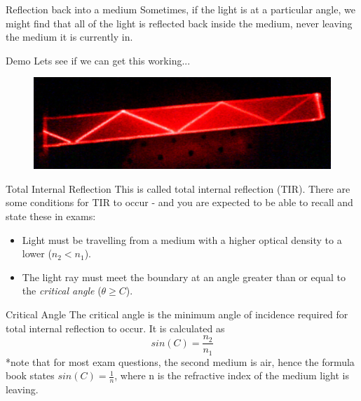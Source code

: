 \documentclass[../Main.tex]{subfiles}
\begin{document}
\begin{frame}{Reflection back into a medium}
    Sometimes, if the light is at a particular angle, we might find that all of the light is reflected back inside the medium, never leaving the medium it is currently in. \pause
    \begin{block}{Demo}
    Lets see if we can get this working... 
    \end{block} \pause
    \begin{figure}
        \centering
        \includegraphics[width=\textwidth]{Waves_Images/totalinternalreflectiondemo.jpg}
    \end{figure}
\end{frame}

\begin{frame}{Total Internal Reflection}
    This is called total internal reflection (TIR). There are some conditions for TIR to occur - and you are expected to be able to recall and state these in exams:
    \begin{itemize}
        \item Light must be travelling from a medium with a higher optical density to a lower ($n_2<n_1$).
        \item The light ray must meet the boundary at an angle greater than or equal to the \emph{critical angle} ($\theta \geq C$).
    \end{itemize}\pause
    \begin{block}{Critical Angle}
    The critical angle is the minimum angle of incidence required for total internal reflection to occur. It is calculated as 
    \begin{equation*}
        sin (C) = \frac{n_2}{n_1}
    \end{equation*}
    *note that for most exam questions, the second medium is air, hence the formula book states $sin (C) = \frac{1}{n}$, where n is the refractive index of the medium light is leaving.
    \end{block}
\end{frame}
\end{document}

